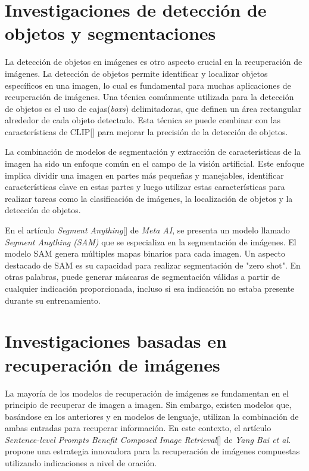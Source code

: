 \section{Investigaciones de detección de objetos y segmentaciones}

La detección de objetos en imágenes es otro aspecto crucial en la recuperación de imágenes. La detección de objetos permite identificar y localizar objetos específicos en una imagen, lo cual es fundamental para muchas aplicaciones de recuperación de imágenes. Una técnica comúnmente utilizada para la detección de objetos es el uso de cajas(\textit{boxs}) delimitadoras, que definen un área rectangular alrededor de cada objeto detectado. Esta técnica se puede combinar con las características de CLIP[\cite{clip}] para mejorar la precisión de la detección de objetos.

La combinación de modelos de segmentación y extracción de características de la imagen ha sido un enfoque común en el campo de la visión artificial. Este enfoque implica dividir una imagen en partes más pequeñas y manejables, identificar características clave en estas partes y luego utilizar estas características para realizar tareas como la clasificación de imágenes, la localización de objetos y la detección de objetos.

En el artículo \textit{Segment Anything}[\cite{sam-paper}] de \textit{Meta AI}, se presenta un modelo llamado \textit{Segment Anything (SAM)} que se especializa en la segmentación de imágenes. El modelo SAM genera múltiples mapas binarios para cada imagen. Un aspecto destacado de SAM es su capacidad para realizar segmentación de "zero shot". En otras palabras, puede generar máscaras de segmentación válidas a partir de cualquier indicación proporcionada, incluso si esa indicación no estaba presente durante su entrenamiento. 

\section{Investigaciones basadas en recuperaci\'on de im\'agenes}

La mayoría de los modelos de recuperación de imágenes se fundamentan en el principio de recuperar de imagen a imagen. Sin embargo, existen modelos que, basándose en los anteriores y en modelos de lenguaje, utilizan la combinación de ambas entradas para recuperar información. En este contexto, el artículo \textit{Sentence-level Prompts Benefit Composed Image Retrieval}[\cite{sentence-level}] de \textit{Yang Bai et al.} propone una estrategia innovadora para la recuperación de imágenes compuestas utilizando indicaciones a nivel de oración.

